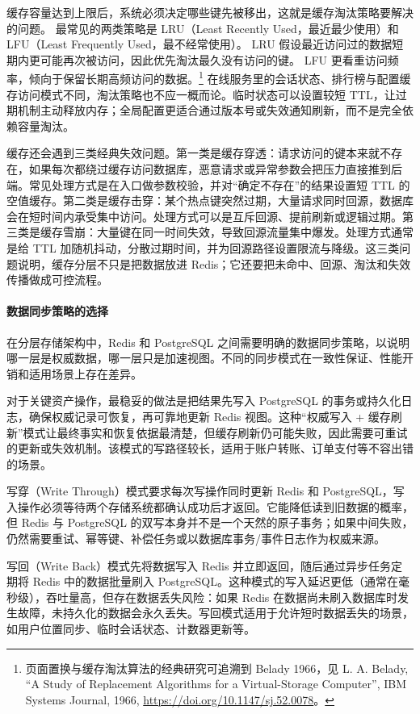 缓存容量达到上限后，系统必须决定哪些键先被移出，这就是缓存淘汰策略要解决的问题。
最常见的两类策略是 LRU（Least Recently Used，最近最少使用）和 LFU（Least Frequently Used，最不经常使用）。
LRU 假设最近访问过的数据短期内更可能再次被访问，因此优先淘汰最久没有访问的键。
LFU 更看重访问频率，倾向于保留长期高频访问的数据。\footnote{页面置换与缓存淘汰算法的经典研究可追溯到 Belady 1966，见 L. A. Belady, ``A Study of Replacement Algorithms for a Virtual-Storage Computer'', IBM Systems Journal, 1966, \url{https://doi.org/10.1147/sj.52.0078}。}
在线服务里的会话状态、排行榜与配置缓存访问模式不同，淘汰策略也不应一概而论。临时状态可以设置较短 TTL，让过期机制主动释放内存；全局配置更适合通过版本号或失效通知刷新，而不是完全依赖容量淘汰。

缓存还会遇到三类经典失效问题。第一类是缓存穿透：请求访问的键本来就不存在，如果每次都绕过缓存访问数据库，恶意请求或异常参数会把压力直接推到后端。常见处理方式是在入口做参数校验，并对“确定不存在”的结果设置短 TTL 的空值缓存。第二类是缓存击穿：某个热点键突然过期，大量请求同时回源，数据库会在短时间内承受集中访问。处理方式可以是互斥回源、提前刷新或逻辑过期。第三类是缓存雪崩：大量键在同一时间失效，导致回源流量集中爆发。处理方式通常是给 TTL 加随机抖动，分散过期时间，并为回源路径设置限流与降级。这三类问题说明，缓存分层不只是把数据放进 Redis；它还要把未命中、回源、淘汰和失效传播做成可控流程。

\paragraph{数据同步策略的选择}
在分层存储架构中，Redis 和 PostgreSQL 之间需要明确的数据同步策略，以说明哪一层是权威数据，哪一层只是加速视图。不同的同步模式在一致性保证、性能开销和适用场景上存在差异。

对于关键资产操作，最稳妥的做法是把结果先写入 PostgreSQL 的事务或持久化日志，确保权威记录可恢复，再可靠地更新 Redis 视图。这种“权威写入 + 缓存刷新”模式让最终事实和恢复依据最清楚，但缓存刷新仍可能失败，因此需要可重试的更新或失效机制。该模式的写路径较长，适用于账户转账、订单支付等不容出错的场景。

写穿（Write Through）模式要求每次写操作同时更新 Redis 和 PostgreSQL，写入操作必须等待两个存储系统都确认成功后才返回。它能降低读到旧数据的概率，但 Redis 与 PostgreSQL 的双写本身并不是一个天然的原子事务；如果中间失败，仍然需要重试、幂等键、补偿任务或以数据库事务/事件日志作为权威来源。

写回（Write Back）模式先将数据写入 Redis 并立即返回，随后通过异步任务定期将 Redis 中的数据批量刷入 PostgreSQL。这种模式的写入延迟更低（通常在毫秒级），吞吐量高，但存在数据丢失风险：如果 Redis 在数据尚未刷入数据库时发生故障，未持久化的数据会永久丢失。写回模式适用于允许短时数据丢失的场景，如用户位置同步、临时会话状态、计数器更新等。

